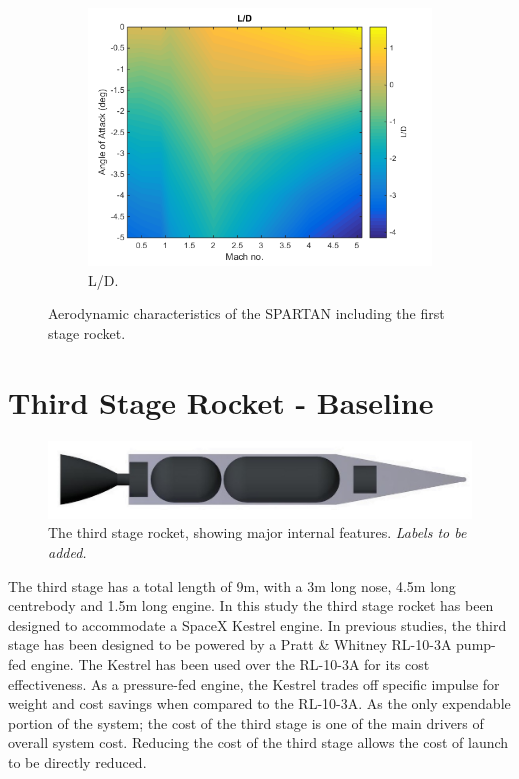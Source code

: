 \begin{figure}
\begin{subfigure}{.5\textwidth}
		\includegraphics[width=0.99\linewidth]{figures/3_vehicle_design/FirstStageLD}
		\caption{L/D.}
		\label{fig:LD-EFirstStage}
	\end{subfigure}
	\caption{Aerodynamic characteristics of the SPARTAN including the first stage rocket.}
	\label{fig:FirstStageAero}
\end{figure}


	

	\section{Third Stage Rocket - Baseline}\label{sec:ThirdStageBaseline}
	
	\begin{figure}
\centering
\includegraphics[width=0.7\linewidth]{figures/3_vehicle_design/3rdStage}
\caption{The third stage rocket, showing major internal features. \textit{Labels to be added.}}
\label{fig:3rdStage}
\end{figure}
	
	
	The third stage has a total length of 9m, with a 3m long nose, 4.5m long centrebody and 1.5m long engine.
	In this study the third stage rocket has been designed to accommodate a SpaceX Kestrel engine. In previous studies, the third stage has been designed to be powered by a Pratt \& Whitney RL-10-3A pump-fed engine. The Kestrel has been used over the RL-10-3A for its cost effectiveness. As a pressure-fed engine, the Kestrel trades off specific impulse for weight and cost savings when compared to the RL-10-3A. As the only expendable portion of the system; the cost of the third stage is one of the main drivers of overall system cost. Reducing the cost of the third stage allows the cost of launch to be directly reduced. 
	
